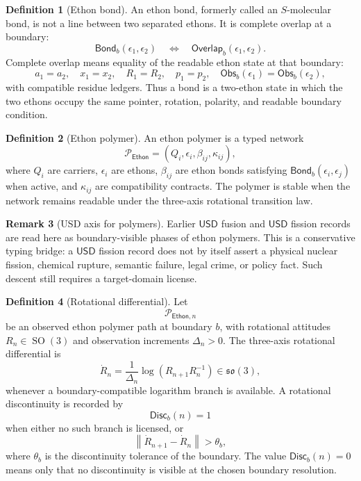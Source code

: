\documentclass[11pt]{article}
\theoremstyle{definition}
\newtheorem{definition}{Definition}[section]
\newtheorem{remark}[definition]{Remark}
\theoremstyle{plain}
\newcommand{\Eth}{\mathsf{Ethon}}
\newcommand{\Obs}{\mathsf{Obs}}
\newcommand{\Bond}{\mathsf{Bond}}
\newcommand{\Overlap}{\mathsf{Overlap}}
\newcommand{\USD}{\mathsf{USD}}
\newcommand{\Disc}{\mathsf{Disc}}
\DeclareMathOperator{\SO}{SO}
\begin{document}
\begin{definition}[Ethon bond]
An ethon bond, formerly called an \(S\)-molecular bond, is not a line
between two separated ethons.  It is complete overlap at a boundary:
\[
  \Bond_b(\epsilon_1,\epsilon_2)
  \quad\Longleftrightarrow\quad
  \Overlap_b(\epsilon_1,\epsilon_2).
\]
Complete overlap means equality of the readable ethon state at that
boundary:
\[
  a_1=a_2,\quad
  x_1=x_2,\quad
  R_1=R_2,\quad
  p_1=p_2,\quad
  \Obs_b(\epsilon_1)=\Obs_b(\epsilon_2),
\]
with compatible residue ledgers.  Thus a bond is a two-ethon state in
which the two ethons occupy the same pointer, rotation, polarity, and
readable boundary condition.
\end{definition}

\begin{definition}[Ethon polymer]
An ethon polymer is a typed network
\[
  \mathcal P_{\Eth}
  =
  (Q_i,\epsilon_i,\beta_{ij},\kappa_{ij}),
\]
where \(Q_i\) are carriers, \(\epsilon_i\) are ethons, \(\beta_{ij}\) are
ethon bonds satisfying \(\Bond_b(\epsilon_i,\epsilon_j)\) when active,
and \(\kappa_{ij}\) are compatibility contracts.  The polymer is stable
when the network remains readable under the three-axis rotational
transition law.
\end{definition}

\begin{remark}[USD axis for polymers]
Earlier \(\USD\) fusion and \(\USD\) fission records are read here as
boundary-visible phases of ethon polymers.  This is a conservative
typing bridge: a \(\USD\) fission record does not by itself assert a
physical nuclear fission, chemical rupture, semantic failure, legal
crime, or policy fact.  Such descent still requires a target-domain
license.
\end{remark}

\begin{definition}[Rotational differential]
Let
\[
  \mathcal P_{\Eth,n}
\]
be an observed ethon polymer path at boundary \(b\), with rotational
attitudes \(R_n\in\SO(3)\) and observation increments \(\Delta_n>0\).
The three-axis rotational differential is
\[
  \dot R_n
  =
  \frac{1}{\Delta_n}
  \log(R_{n+1}R_n^{-1})
  \in\mathfrak{so}(3),
\]
whenever a boundary-compatible logarithm branch is available.  A
rotational discontinuity is recorded by
\[
  \Disc_b(n)=1
\]
when either no such branch is licensed, or
\[
  \left\|\dot R_{n+1}-\dot R_n\right\|>\theta_b,
\]
where \(\theta_b\) is the discontinuity tolerance of the boundary.  The
value \(\Disc_b(n)=0\) means only that no discontinuity is visible at the
chosen boundary resolution.
\end{definition}
\end{document}
